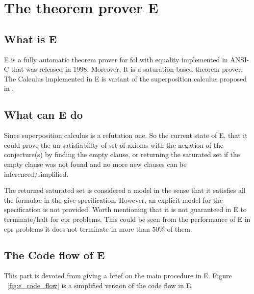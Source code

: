 \section{The theorem prover E} \label{sec:c2s3}
\subsection{What is E}
E is a fully automatic theorem prover for \ac{fol} with equality implemented in ANSI-C that was released in 1998. Moreover, It is a saturation-based theorem prover. The Calculus implemented in E is variant of the superposition calculus proposed in \cite{BAGA94}.


\subsection{What can E do}
Since superposition calculus is a refutation one. So the current state of E, that it could prove the un-satisfiability of set of axioms with the negation of the conjecture(s) by finding the empty clause, or returning the saturated set if the empty clause was not found and no more new clauses can be inferenced/simplified. 


The returned saturated set is considered a model in the sense that it satisfies all the formulae in the give specification. However, an explicit model for the specification is not provided. Worth mentioning that it is not guaranteed in E to terminate/halt for \ac{epr} problems. This could be seen from the performance of E in \ac{epr} problems it does not terminate in more than 50\% of them. 



\subsection{The Code flow of E}
This part is devoted from giving a brief on the main procedure in E. Figure ~\ref{fig:e_code_flow} is a simplified version of the code flow in E.

